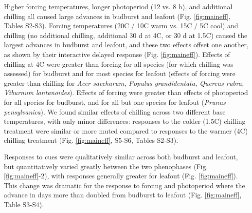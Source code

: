\documentclass[11pt]{article}
\begin{document}
Higher forcing temperatures, longer photoperiod (12 vs. 8 h), and additional chilling all caused large advances in budburst and leafout (Fig. \ref{fig:maineff}, Tables S2-S3). Forcing temperatures (20\degree C / 10\degree C warm vs. 15\degree C / 5\degree C cool) and chilling (no additional chilling,  additional 30 d at 4\degree C, or 30 d at 1.5\degree C) caused the largest advances in budburst and leafout, and these two effects offset one another, as shown by their interactive delayed response (Fig. \ref{fig:maineff}). Effects of chilling at 4\degree C were greater than forcing for all species (for which chilling was assessed) for budburst and for most species for leafout (effects of forcing were greater than chilling for \emph{Acer saccharum, Populus grandidentata, Quercus rubra, Viburnum lantanoides}). Effects of forcing were greater than effects of photoperiod for all species for budburst, and for all but one species for leafout (\emph{Prunus pensylvanica}). We found similar effects of chilling across two different base temperatures, with only minor differences: responses to the colder (1.5\degree C) chilling treatment were similar or more muted compared to responses to the warmer  (4\degree C) chilling treatment (Fig. \ref{fig:maineff}, S5-S6, Tables S2-S3). 

Responses to cues were qualitatively similar across both budburst and leafout, but quantitatively varied greatly between the two phenophases (Fig. \ref{fig:maineff}-2), with responses generally greater for leafout (Fig. \ref{fig:maineff}). This change was dramatic for the response to forcing and photoperiod where the advance in days more than doubled from budburst to leafout (Fig. \ref{fig:maineff}, Table S3-S4).
\end{document}
